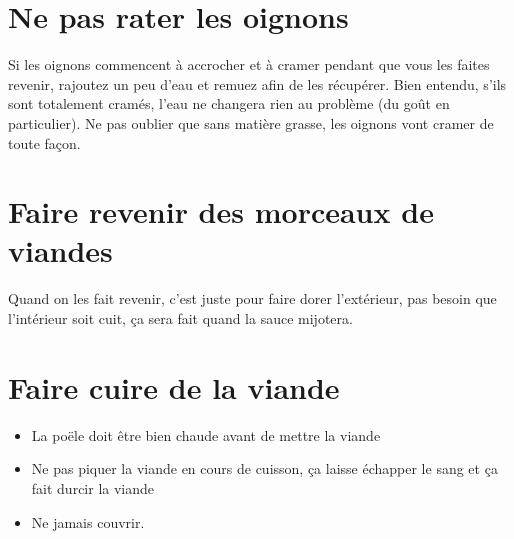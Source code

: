 \documentclass[a4paper,twoside]{report}
\begin{document}
\section{Ne pas rater les oignons}
Si les oignons commencent à accrocher et à cramer pendant que vous les faites revenir, rajoutez un peu d'eau et remuez afin de les récupérer. Bien entendu, s'ils sont totalement cramés, l'eau ne changera rien au problème (du goût en particulier). Ne pas oublier que sans matière grasse, les oignons vont cramer de toute façon.

\section{Faire revenir des morceaux de viandes}
Quand on les fait revenir, c'est juste pour faire dorer l'extérieur, pas besoin que l'intérieur soit cuit, ça sera fait quand la sauce mijotera.

\section{Faire cuire de la viande}
\begin{itemize}
\item La poële doit être bien chaude avant de mettre la viande
\item Ne pas piquer la viande en cours de cuisson, ça laisse échapper le sang et ça fait durcir la viande
\item Ne jamais couvrir.
\end{itemize}
\end{document}
